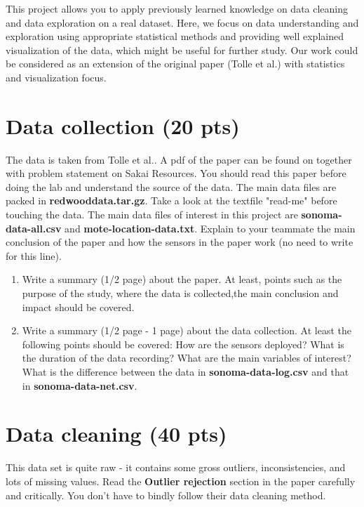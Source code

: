 \documentclass[11pt]{article}
\begin{document}
This project allows you to apply previously learned knowledge on data cleaning and data exploration on a real dataset. Here, we focus on data understanding and exploration using appropriate statistical methods and providing well explained visualization of the data, which might be useful for further study. Our work could be considered as an extension of the original paper (Tolle et al.) with statistics and visualization focus.

\section{Data collection (20 pts)}
The data is taken from Tolle et al.. A pdf of the paper can be found on together with problem statement on Sakai Resources. You should read this paper before doing the lab and understand the source of the data.
The main data files are packed in \textbf{redwooddata.tar.gz}. Take a look at the textfile "read-me" before touching the data. The main data files of interest in this project are \textbf{sonoma-data-all.csv} and \textbf{mote-location-data.txt}.
Explain to your teammate the main conclusion of the paper and how the sensors in the paper work (no need to write for this line). 

\begin{enumerate}[label=(\alph*)]
\item Write a summary (1/2 page) about the paper. At least, points such as the purpose of the study, where the data is collected,the main conclusion and impact should be covered.
\item Write a summary (1/2 page - 1 page) about the data collection. At least the following points should be covered: How are the sensors deployed? What is the duration of the data recording? What are the main variables of interest? What is the difference between the data in \textbf{sonoma-data-log.csv} and that in \textbf{sonoma-data-net.csv}.
\end{enumerate}

\section{Data cleaning (40 pts)}
This data set is quite raw - it contains some gross outliers, inconsistencies, and lots of missing values. Read the \textbf{Outlier rejection} section in the paper carefully and critically. You don't have to bindly follow their data cleaning method.
\end{document}
